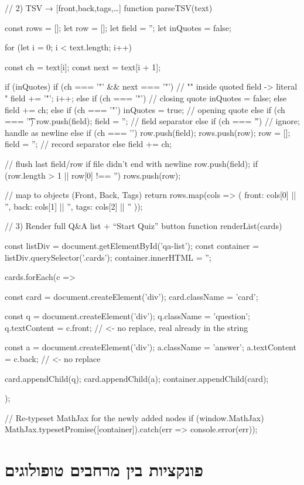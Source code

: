 \documentclass{tstextbook}
\begin{document}
    // 2) TSV → [{front,back,tags},…]
    function parseTSV(text) {
  const rows = [];
  let row = [];
  let field = '';
  let inQuotes = false;

  for (let i = 0; i < text.length; i++) {
    const ch = text[i];
    const next = text[i + 1];

    if (inQuotes) {
      if (ch === '"' && next === '"') {
        // "" inside quoted field -> literal "
        field += '"';
        i++;
      } else if (ch === '"') {
        // closing quote
        inQuotes = false;
      } else {
        field += ch;
      }
    } else {
      if (ch === '"') {
        inQuotes = true;                // opening quote
      } else if (ch === '\t') {
        row.push(field); field = '';    // field separator
      } else if (ch === '\r') {
        // ignore; handle \n as newline
      } else if (ch === '\n') {
        row.push(field); rows.push(row);
        row = []; field = '';           // record separator
      } else {
        field += ch;
      }
    }
  }
  // flush last field/row if file didn't end with newline
  row.push(field);
  if (row.length > 1 || row[0] !== '') rows.push(row);

  // map to objects (Front, Back, Tags)
  return rows.map(cols => ({
    front: cols[0] || '',
    back:  cols[1] || '',
    tags:  cols[2] || ''
  }));
}
// 3) Render full Q&A list + “Start Quiz” button
function renderList(cards) {
  const listDiv = document.getElementById('qa-list');
  const container = listDiv.querySelector('.cards');
  container.innerHTML = '';

  cards.forEach(c => {
    const card = document.createElement('div');
    card.className = 'card';

    const q = document.createElement('div');
    q.className = 'question';
    q.textContent = c.front;   // <- no replace, real \n already in the string

    const a = document.createElement('div');
    a.className = 'answer';
    a.textContent = c.back;    // <- no replace

    card.appendChild(q);
    card.appendChild(a);
    container.appendChild(card);
  });

  // Re-typeset MathJax for the newly added nodes
  if (window.MathJax) {
    MathJax.typesetPromise([container]).catch(err => console.error(err));
  }
}
  \chapter{פונקציות בין מרחבים טופולוגים}
\end{document}
